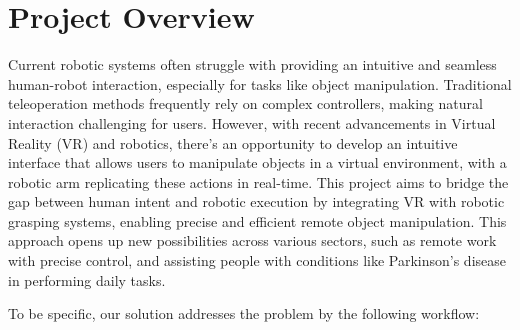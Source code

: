\documentclass{senior-design-individual}
\begin{document}
\section{Project Overview}
Current robotic systems often struggle with providing an intuitive and seamless 
human-robot interaction, especially for tasks like object manipulation. 
Traditional teleoperation methods frequently rely on complex controllers, 
making natural interaction challenging for users. However, with recent 
advancements in Virtual Reality (VR) and robotics, there's an opportunity to 
develop an intuitive interface that allows users to manipulate objects in a 
virtual environment, with a robotic arm replicating these actions in real-time. 
This project aims to bridge the gap between human intent and robotic execution 
by integrating VR with robotic grasping systems, enabling precise and efficient 
remote object manipulation. This approach opens up new possibilities across 
various sectors, such as remote work with precise control, and assisting people 
with conditions like Parkinson’s disease in performing daily tasks.
 
To be specific, our solution addresses the problem by the following workflow:
\end{document}
